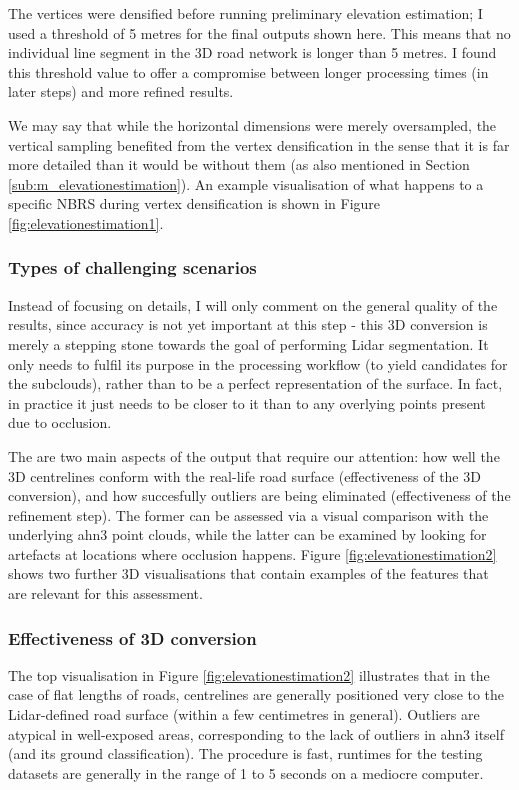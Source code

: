 The vertices were densified before running preliminary elevation estimation; I used a threshold of 5 metres for the final outputs shown here. This means that no individual line segment in the 3D road network is longer than 5 metres. I found this threshold value to offer a compromise between longer processing times (in later steps) and more refined results.

We may say that while the horizontal dimensions were merely oversampled, the vertical sampling benefited from the vertex densification in the sense that it is far more detailed than it would be without them (as also mentioned in Section \ref{sub:m_elevationestimation}). An example visualisation of what happens to a specific NBRS during vertex densification is shown in Figure \ref{fig:elevationestimation1}.

\subsubsection{Types of challenging scenarios}

Instead of focusing on details, I will only comment on the general quality of the results, since accuracy is not yet important at this step - this 3D conversion is merely a stepping stone towards the goal of performing Lidar segmentation. It only needs to fulfil its purpose in the processing workflow (to yield candidates for the subclouds), rather than to be a perfect representation of the surface. In fact, in practice it just needs to be closer to it than to any overlying points present due to occlusion.

The are two main aspects of the output that require our attention: how well the 3D centrelines conform with the real-life road surface (effectiveness of the 3D conversion), and how succesfully outliers are being eliminated (effectiveness of the refinement step). The former can be assessed via a visual comparison with the underlying \ac{ahn3} point clouds, while the latter can be examined by looking for artefacts at locations where occlusion happens. Figure \ref{fig:elevationestimation2} shows two further 3D visualisations that contain examples of the features that are relevant for this assessment.

\subsubsection{Effectiveness of 3D conversion}

The top visualisation in Figure \ref{fig:elevationestimation2} illustrates that in the case of flat lengths of roads, centrelines are generally positioned very close to the Lidar-defined road surface (within a few centimetres in general). Outliers are atypical in well-exposed areas, corresponding to the lack of outliers in \ac{ahn3} itself (and its ground classification). The procedure is fast, runtimes for the testing datasets are generally in the range of 1 to 5 seconds on a mediocre computer.

